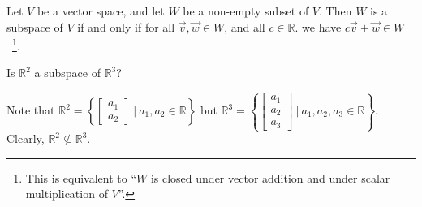 \documentclass[11pt,fleqn]{book} %
\begin{document}
\setcounter{section}{2}
\setcounter{dummy}{7}
\begin{theorem}
    Let $V$ be a vector space, and let $W$ be a non-empty subset of $V$. Then $W$ is a subspace of $V$ if and only if for all $\overrightarrow{v}, \overrightarrow{w} \in W$, and all $c \in \mathbb{R}$. we have $c\overrightarrow{v} + \overrightarrow{w} \in W$~\footnote{This is equivalent to ``$W$ is closed under vector addition and under scalar multiplication of $V$''. }.
\end{theorem}
\setcounter{section}{3}

\begin{example}
    Is $\mathbb{R}^2$ a subspace of $\mathbb{R}^3$? 
    
    Note that $\mathbb{R}^2 = \left\{ \begin{bmatrix}a _1 \\ a_2 \end{bmatrix} ~|~ a_1,a_2 \in \mathbb{R} \right\}$ but $\mathbb{R}^3 = \left\{ \begin{bmatrix}a _1 \\ a_2 \\ a_3 \end{bmatrix} ~|~ a_1,a_2,a_3 \in \mathbb{R} \right\}$. Clearly, $\mathbb{R}^2 \not\subseteq \mathbb{R}^3$. 
\end{example}
\end{document}
